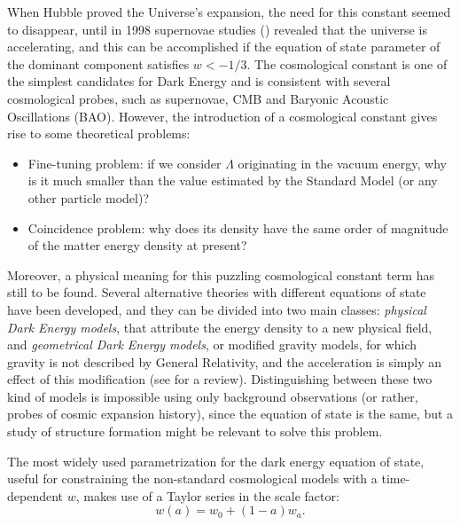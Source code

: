 When Hubble proved the Universe's expansion, the need for this constant seemed to disappear, until in 1998 supernovae studies (\citealt{Riess,perlmutter}) revealed that the universe is accelerating, and this can be accomplished if the equation of state parameter of the dominant component satisfies $w < -1/3$. The cosmological constant is one of the simplest candidates for Dark Energy and is consistent with several cosmological probes, such as supernovae, CMB and Baryonic Acoustic Oscillations (BAO). 
However, the introduction of a cosmological constant gives rise to some theoretical problems:
\begin{itemize}
\item Fine-tuning problem: if we consider $\Lambda$ originating in the vacuum energy, why is it much smaller than the value estimated by the Standard Model (or any other particle model)?
\item Coincidence problem: why does its density have the same order of magnitude of the matter energy density at present?
\end{itemize}

Moreover, a physical meaning for this puzzling cosmological constant term has still to be found. Several alternative theories with different equations of state have been developed, and they can be divided into two main classes: \emph{physical Dark Energy models}, that attribute the energy density to a new physical field, and \emph{geometrical Dark Energy models}, or modified gravity models, for which gravity is not described by General Relativity, and the acceleration is simply an effect of this modification (see \citealt{2009RPPh...72i6901S} for a review). Distinguishing between these two kind of models is impossible using only background observations (or rather, probes of cosmic expansion history), since the equation of state is the same, but a study of structure formation might be relevant to solve this problem.

The most widely used parametrization for the dark energy equation of state, useful for constraining the non-standard cosmological models with a time-dependent $w$, makes use of a Taylor series in the scale factor:
\begin{equation}
w(a)=w_0+(1-a)w_a. \label{wa}
\end {equation}

